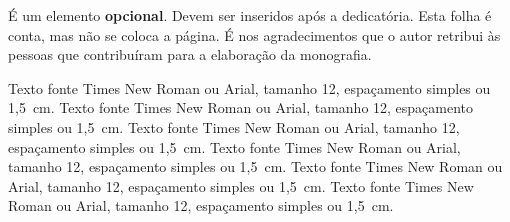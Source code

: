 É um elemento \textbf{opcional}. Devem ser inseridos após a dedicatória. Esta folha é
conta, mas não se coloca a página. É nos agradecimentos que o autor retribui
às pessoas que contribuíram para a elaboração da monografia.

Texto fonte Times New Roman ou Arial, tamanho 12, espaçamento simples ou
1,5~cm. Texto fonte Times New Roman ou Arial, tamanho 12, espaçamento simples
ou 1,5~cm. Texto fonte Times New Roman ou Arial, tamanho 12, espaçamento
simples ou 1,5~cm. Texto fonte Times New Roman ou Arial, tamanho 12,
espaçamento simples ou 1,5~cm. Texto fonte Times New Roman ou Arial, tamanho
12, espaçamento simples ou 1,5~cm. Texto fonte Times New Roman ou Arial,
tamanho 12, espaçamento simples ou 1,5~cm.

